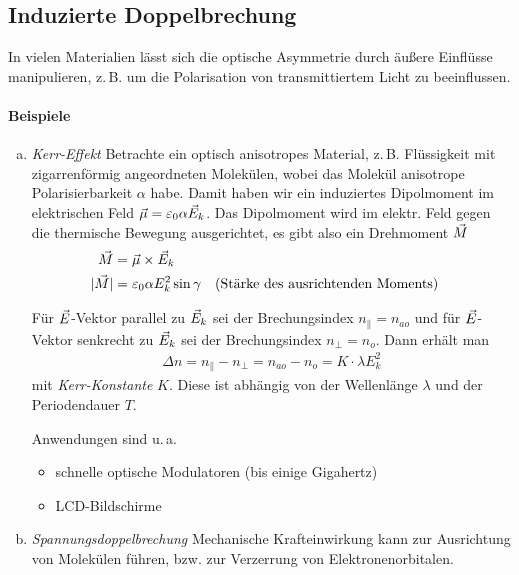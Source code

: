 
\subsection{Induzierte Doppelbrechung}
In vielen Materialien lässt sich die optische Asymmetrie durch äußere
Einflüsse manipulieren, z.\,B. um die Polarisation von transmittiertem
Licht zu beeinflussen.
\paragraph{Beispiele}
\begin{enumerate}[a)]
\item \emph{Kerr-Effekt}
  Betrachte ein optisch anisotropes Material, z.\,B. Flüssigkeit mit
  zigarrenförmig angeordneten Molekülen, wobei das Molekül anisotrope
  Polarisierbarkeit $\alpha$ habe.
  Damit haben wir ein induziertes Dipolmoment im elektrischen Feld
  $\vec{\mu} = \varepsilon_0\alpha\vec{E}_k$.
  Das Dipolmoment wird im elektr. Feld gegen die thermische Bewegung
  ausgerichtet, es gibt also ein Drehmoment
  $\vec{M}$
  \begin{align*}
    \vec{M} &= \vec{\mu}\times \vec{E}_k\\
    |\vec{M}| &= \varepsilon_0\alpha E_k^2\sin\gamma 
            &&\text{(Stärke des ausrichtenden Moments)}
  \end{align*}
  
  Für $\vec{E}$-Vektor parallel zu $\vec{E}_k$ sei der
  Brechungsindex $n_\parallel=n_{ao}$ und für
  $\vec{E}$-Vektor senkrecht zu $\vec{E}_k$ sei der
  Brechungsindex $n_\bot=n_{o}$. Dann erhält man
  \begin{gather*}
    \Delta n = n_\parallel - n_\bot = n_{ao}-n_o =
    K\cdot \lambda E_k^2
  \end{gather*}%
  mit \emph{Kerr-Konstante} $K$.
  Diese ist abhängig von der Wellenlänge $\lambda$ und der Periodendauer
  $T$.
  
  Anwendungen sind u.\,a.
  \begin{itemize}
  \item schnelle optische Modulatoren (bis einige Gigahertz)
  \item LCD-Bildschirme
  \end{itemize}
  
\item \emph{Spannungsdoppelbrechung}
  Mechanische Krafteinwirkung kann zur Ausrichtung von Molekülen
  führen, bzw. zur Verzerrung von Elektronenorbitalen.


\end{enumerate}
